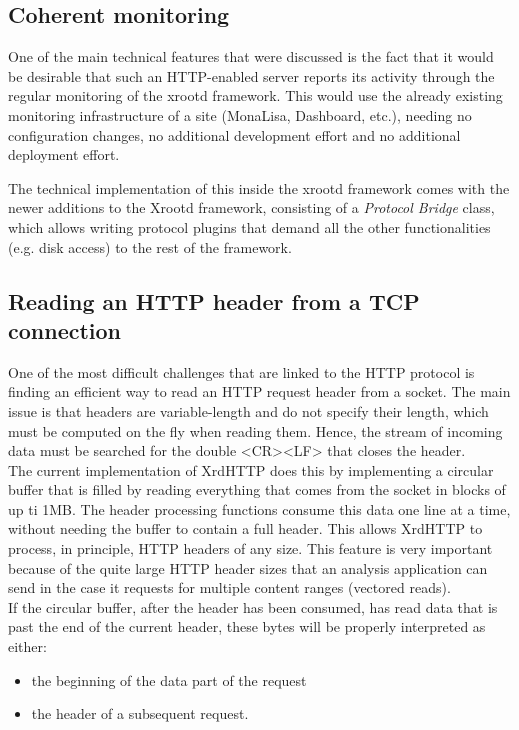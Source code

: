 \documentclass[12pt]{article} %
\begin{document}
\subsection{Coherent monitoring}

One of the main technical features that were discussed is the fact that it would be desirable that such an HTTP-enabled server reports its activity through the regular monitoring of the xrootd framework. This would use the already existing monitoring infrastructure of a site (MonaLisa, Dashboard, etc.), needing no configuration changes, no additional development effort and no additional deployment effort.

The technical implementation of this inside the xrootd framework comes with the newer additions to the Xrootd framework, consisting of a \textit{Protocol Bridge} class, which allows writing protocol plugins that demand all the other functionalities (e.g. disk access) to the rest of the framework.

\subsection{Reading an HTTP header from a TCP connection}

One of the most difficult challenges that are linked to the HTTP protocol is finding an efficient way to read an HTTP request header from a socket. The main issue is that headers are variable-length and do not specify their length, which must be computed on the fly when reading them. Hence, the stream of incoming data must be searched for the double <CR><LF> that closes the header.\\
The current implementation of XrdHTTP does this by implementing a circular buffer that is filled by reading everything that comes from the socket in blocks of up ti 1MB. The header processing functions consume this data one line at a time, without needing the buffer to contain a full header. This allows XrdHTTP to process, in principle, HTTP headers of any size. This feature is very important because of the quite large HTTP header sizes that an analysis application can send in the case it requests for multiple content ranges (vectored reads).\\
If the circular buffer, after the header has been consumed, has read data that is past the end of the current header, these bytes will be properly interpreted as either:
\begin{itemize}
 \item the beginning of the data part of the request
 \item the header of a subsequent request.
\end{itemize}
\end{document}
